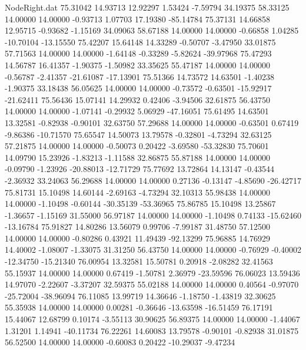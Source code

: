 \begin{filecontents}{NodeRight.dat}
  75.31042   14.93713   12.92297     1.53424   -7.59794   34.19375   58.33125   14.00000   14.00000   -0.93713    1.07703   17.19380  -85.14784
  75.37131   14.66858   12.95715    -0.93682   -1.15169   34.09063   58.67188   14.00000   14.00000   -0.66858    1.04285  -10.70104  -13.15550
  75.42207   15.64148   14.33289    -0.50707   -3.47950   33.01875   57.71563   14.00000   14.00000   -1.64148   -0.33289   -5.82624  -39.97968
  75.47293   14.56787   16.41357    -1.90375   -1.50982   33.35625   55.47187   14.00000   14.00000   -0.56787   -2.41357  -21.61087  -17.13901
  75.51366   14.73572   14.63501    -1.40238   -1.90375   33.18438   56.05625   14.00000   14.00000   -0.73572   -0.63501  -15.92917  -21.62411
  75.56436   15.07141   14.29932     0.42406   -3.94506   32.61875   56.43750   14.00000   14.00000   -1.07141   -0.29932    5.06929  -47.16051
  75.61495   14.63501   13.32581    -0.82938   -0.90101   32.63750   57.29688   14.00000   14.00000   -0.63501    0.67419   -9.86386  -10.71570
  75.65547   14.50073   13.79578    -0.32801   -4.73294   32.63125   57.21875   14.00000   14.00000   -0.50073    0.20422   -3.69580  -53.32830
  75.70601   14.09790   15.23926    -1.83213   -1.11588   32.86875   55.87188   14.00000   14.00000   -0.09790   -1.23926  -20.88013  -12.71729
  75.77692   13.72864   14.13147    -0.43544   -2.36932   33.24063   56.29688   14.00000   14.00000    0.27136   -0.13147   -4.85690  -26.42717
  75.81731   15.10498   14.60144    -2.69163   -4.73294   32.10313   55.98438   14.00000   14.00000   -1.10498   -0.60144  -30.35139  -53.36965
  75.86785   15.10498   13.25867    -1.36657   -1.15169   31.55000   56.97187   14.00000   14.00000   -1.10498    0.74133  -15.62460  -13.16784
  75.91827   14.80286   13.56079     0.99706   -7.99187   31.48750   57.12500   14.00000   14.00000   -0.80286    0.43921   11.49439  -92.13299
  75.96885   14.76929   14.40002    -1.08007   -1.33075   31.31250   56.43750   14.00000   14.00000   -0.76929   -0.40002  -12.34750  -15.21340
  76.00954   13.32581   15.50781     0.20918   -2.08282   32.41563   55.15937   14.00000   14.00000    0.67419   -1.50781    2.36979  -23.59596
  76.06023   13.59436   14.97070    -2.22607   -3.37207   32.59375   55.02188   14.00000   14.00000    0.40564   -0.97070  -25.72004  -38.96094
  76.11085   13.99719   14.36646    -1.18750   -1.43819   32.30625   55.35938   14.00000   14.00000    0.00281   -0.36646  -13.63598  -16.51459
  76.17191   15.44067   12.68799     0.10174   -3.55113   30.90625   56.89375   14.00000   14.00000   -1.44067    1.31201    1.14941  -40.11734
  76.22261   14.60083   13.79578    -0.90101   -0.82938   31.01875   56.52500   14.00000   14.00000   -0.60083    0.20422  -10.29037   -9.47234

\end{filecontents}
